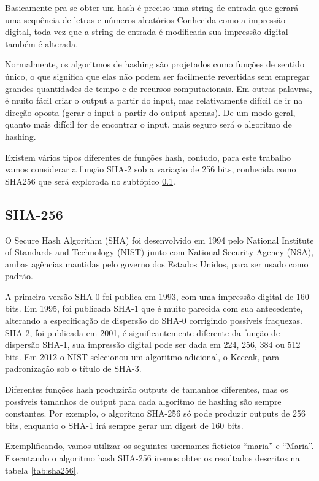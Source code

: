 \documentclass[12pt, a4paper]{report}
\begin{document}
Basicamente pra se obter um hash é preciso uma string de entrada  que gerará uma sequência de letras e números aleatórios Conhecida como a impressão digital, toda vez que a string de entrada é modificada sua impressão digital também é alterada.

Normalmente, os algoritmos de hashing  são projetados como funções de sentido único, o que significa que elas não podem ser facilmente revertidas sem empregar grandes quantidades de tempo e de recursos computacionais. Em outras palavras, é muito fácil criar o output a partir do input, mas relativamente difícil de ir na direção oposta (gerar o input a partir do output apenas). De um modo geral, quanto mais difícil for de encontrar o input, mais seguro será o algoritmo de hashing.

Existem vários tipos diferentes de funções hash, contudo, para este trabalho vamos considerar a função SHA-2 sob a variação de 256 bits, conhecida como SHA256 que será explorada no subtópico \ref{subsec:sha256}.

\subsection{SHA-256}
\label{subsec:sha256}

O Secure Hash Algorithm (SHA) foi desenvolvido em 1994 pelo National Institute of Standards and Technology (NIST) junto com National Security Agency (NSA), ambas agências mantidas pelo governo dos Estados Unidos,  para ser usado como padrão.

A primeira versão SHA-0 foi publica em 1993, com uma impressão digital de 160 bits. Em 1995, foi publicada SHA-1 que é muito parecida com sua antecedente, alterando a especificação de dispersão do SHA-0 corrigindo possíveis fraquezas. SHA-2, foi publicada em 2001, é significantemente diferente da função de dispersão SHA-1, sua impressão digital pode ser dada em 224, 256, 384 ou 512 bits. Em 2012 o NIST selecionou um algoritmo adicional, o Keccak, para padronização sob o título de SHA-3.

Diferentes funções hash produzirão outputs de tamanhos diferentes, mas os possíveis tamanhos de output para cada algoritmo de hashing são sempre constantes. Por exemplo, o algoritmo SHA-256 só pode produzir outputs de 256 bits, enquanto o SHA-1 irá sempre gerar um digest de 160 bits.

Exemplificando, vamos utilizar os seguintes usernames fictícios “maria” e “Maria”. Executando o algoritmo hash SHA-256 iremos obter os resultados descritos na tabela \ref{tab:sha256}.
\end{document}
